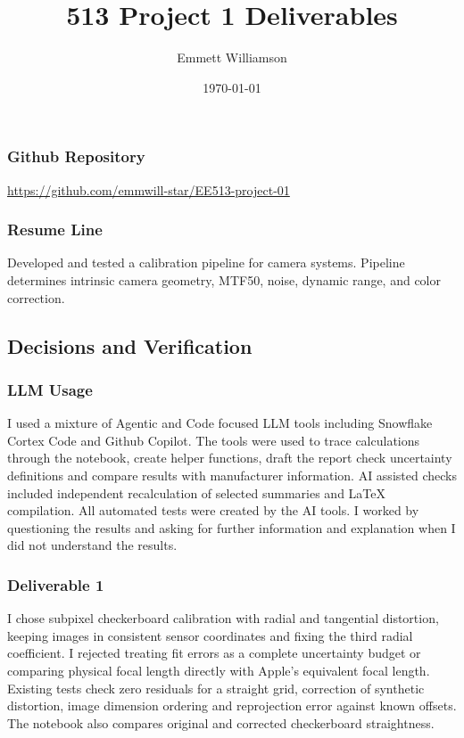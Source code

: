 \documentclass{article}
\title{513 Project 1 Deliverables}
\author{Emmett Williamson}
\date{\today}
\begin{document}
\maketitle

\subsubsection*{Github Repository}
\url{https://github.com/emmwill-star/EE513-project-01}

\subsubsection*{Resume Line}
Developed and tested a calibration pipeline for camera systems.  Pipeline determines intrinsic camera geometry, 
MTF50, noise, dynamic range, and color correction.

\subsection*{Decisions and Verification}
\subsubsection*{LLM Usage}
I used a mixture of Agentic and Code focused LLM tools including Snowflake Cortex Code and Github Copilot.
The tools were used to trace calculations through the notebook, create helper functions, 
draft the report check uncertainty definitions and compare results with manufacturer 
information. AI assisted checks included independent recalculation of selected summaries and LaTeX compilation. 
All automated tests were created by the AI tools.  I worked by questioning the results and 
asking for further information and explanation when I did not understand the results.

\subsubsection*{Deliverable 1}
I chose subpixel checkerboard calibration with radial and tangential distortion, keeping images 
in consistent sensor coordinates and fixing the third radial coefficient. I rejected treating fit 
errors as a complete uncertainty budget or comparing physical focal length directly with Apple’s 
equivalent focal length. Existing tests check zero residuals for a straight grid, correction of synthetic 
distortion, image dimension ordering and reprojection error against known offsets. The notebook also compares 
original and corrected checkerboard straightness. 
\end{document}
